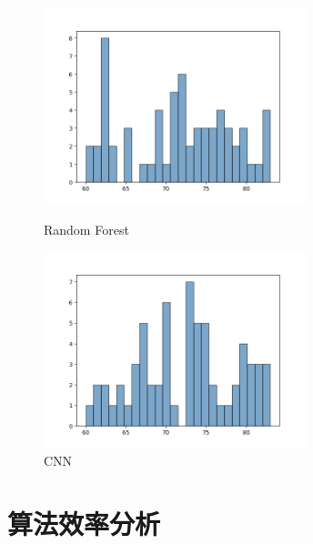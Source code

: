 \documentclass[UTF8,a4paper,10pt]{ctexart}
\begin{document}
\begin{itemize}
    \begin{figure}[H]
    \begin{minipage}[t]{0.5\linewidth}
    \centering
    \includegraphics[width=3in]{output_forest_hist_1.png}
    \caption{Random Forest}
    \label{fig:side:a}
    \end{minipage}%
    \begin{minipage}[t]{0.5\linewidth}
    \centering
    \includegraphics[width=3in]{output_cnn_hist_1.png}
    \caption{CNN}
    \label{fig:side:b}
    \end{minipage}
    \end{figure}
    \end{itemize}

    \section{\textcolor[rgb]{0,0.3,0.6}{算法效率分析}}
\end{document}
